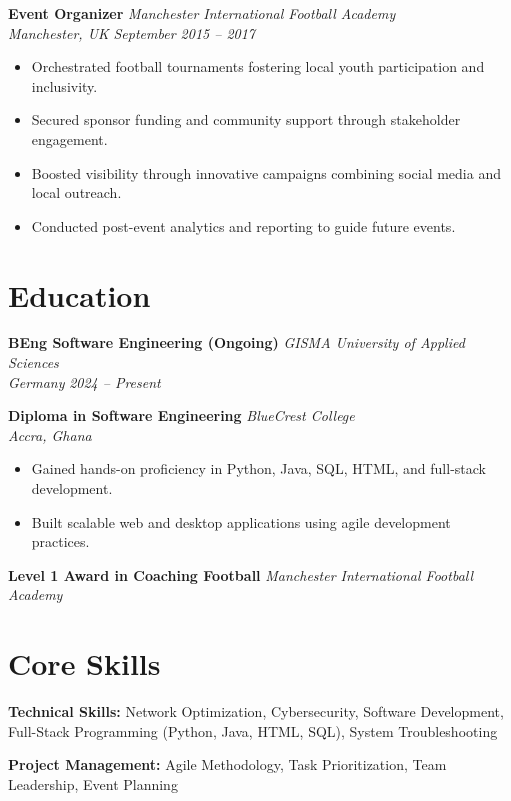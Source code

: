 \documentclass[a4paper,10pt]{article}
\begin{document}
\textbf{Event Organizer} \hfill \textit{Manchester International Football Academy} \\
\textit{Manchester, UK} \hfill \textit{September 2015 – 2017}
\begin{itemize}[leftmargin=*]
    \item Orchestrated football tournaments fostering local youth participation and inclusivity.
    \item Secured sponsor funding and community support through stakeholder engagement.
    \item Boosted visibility through innovative campaigns combining social media and local outreach.
    \item Conducted post-event analytics and reporting to guide future events.
\end{itemize}

\section*{Education}

\textbf{BEng Software Engineering (Ongoing)} \hfill \textit{GISMA University of Applied Sciences} \\
\textit{Germany} \hfill \textit{2024 – Present}

\textbf{Diploma in Software Engineering} \hfill \textit{BlueCrest College} \\
\textit{Accra, Ghana}
\begin{itemize}[leftmargin=*]
    \item Gained hands-on proficiency in Python, Java, SQL, HTML, and full-stack development.
    \item Built scalable web and desktop applications using agile development practices.
\end{itemize}

\textbf{Level 1 Award in Coaching Football} \hfill \textit{Manchester International Football Academy}

\section*{Core Skills}

\textbf{Technical Skills:}
Network Optimization, Cybersecurity, Software Development, Full-Stack Programming (Python, Java, HTML, SQL), System Troubleshooting

\textbf{Project Management:}
Agile Methodology, Task Prioritization, Team Leadership, Event Planning
\end{document}
